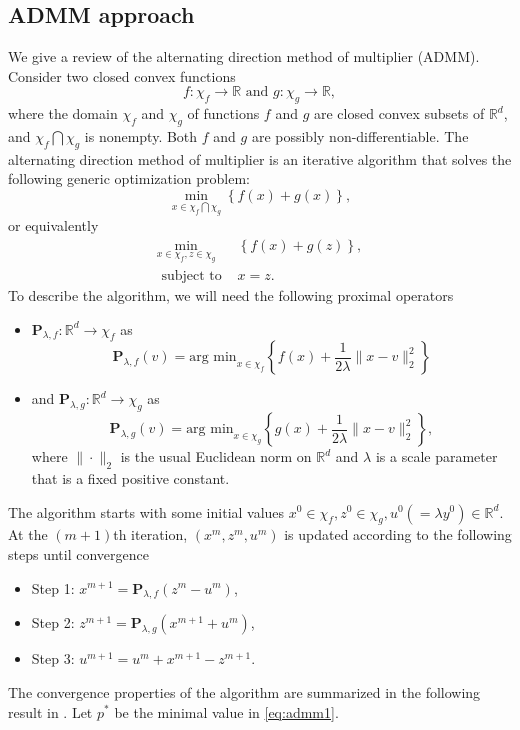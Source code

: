 \documentclass{article}
\begin{document}
\subsection{ADMM approach}
\label{sec:ADMM}
We give a review of the alternating direction method
of multiplier (ADMM).
Consider two closed convex functions
$$
f : \chi_f \to \mathbb{R} \mbox{ and } g : \chi_g \to \mathbb{R},
$$
where the domain $\chi_f$ and $\chi_g$ of functions $f$ and $g$ are closed convex subsets of $\mathbb{R}^d$, and $\chi_f \bigcap \chi_g$ is nonempty.
Both $f$ and $g$ are possibly non-differentiable.
The alternating direction method
of multiplier is an iterative algorithm that solves the following generic optimization problem:
$$
\min_{x \in \chi_f \bigcap \chi_g} \left\{f(x) + g(x) \right\},
$$
or equivalently
\begin{eqnarray}
\label{eq:admm1}
\min_{x \in \chi_f, z\in \chi_g} & \left\{f(x) + g(z) \right\}, \\
\mbox{ subject to } & x = z. \nonumber
\end{eqnarray}
To describe the algorithm, we will need the following proximal operators
\begin{itemize}
\item $\mathbf{P}_{\lambda,f}: \mathbb{R}^d \to \chi_f$ as
$$
\mathbf{P}_{\lambda,f}(v) = \mbox{arg min}_{x \in \chi_f} \left\{
f(x) + \frac{1}{2\lambda} \|x-v\|^2_2
\right\}
$$

\item and $\mathbf{P}_{\lambda,g}: \mathbb{R}^d \to \chi_g$ as
$$
\mathbf{P}_{\lambda,g}(v) = \mbox{arg min}_{x \in \chi_g} \left\{
g(x) + \frac{1}{2\lambda} \|x-v\|^2_2
\right\},
$$
where $\|\cdot\|_2$ is the usual Euclidean norm on $\mathbb{R}^d$ and $\lambda$ is a scale parameter that is a fixed positive constant.
\end{itemize}
The algorithm starts with some initial values $x^0 \in \chi_f,
z^0 \in \chi_g, u^0 (=\lambda y^0) \in \mathbb{R}^d$.
At the $(m+1)$th iteration, $(x^m, z^m, u^m)$ is updated according to the following steps until convergence
\begin{itemize}
\item Step 1: $x^{m+1} = \mathbf{P}_{\lambda,f}(z^m - u^m)$,

\item Step 2: $z^{m+1} = \mathbf{P}_{\lambda,g}(x^{m+1} + u^m)$,

\item Step 3: $u^{m+1} = u^m + x^{m+1} - z^{m+1}$.

\end{itemize}
The convergence properties of the algorithm are summarized in the following result in \cite{boyd2011distributed}.
Let $p^\ast$ be the minimal value in \eqref{eq:admm1}.
\end{document}
